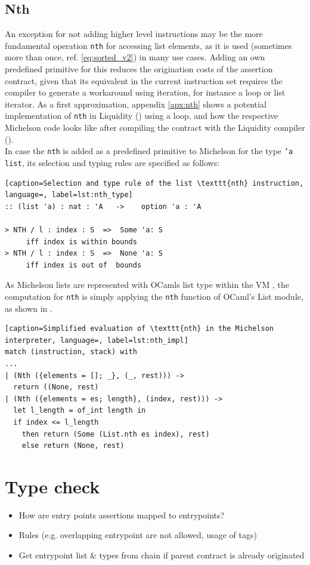 \subsection{Nth}
An exception for not adding higher level instructions may be the more fundamental operation \texttt{nth} for accessing list elements, as it is used (sometimes more than once, ref. \eqref{eq:sorted_v2}) in many use cases. Adding an own predefined primitive for this reduces the origination costs of the assertion contract, given that its equivalent in the current instruction set requires the compiler to generate a workaround using iteration, for instance a loop or list iterator. As a first approximation, appendix \ref{apx:nth} shows a potential implementation of \texttt{nth} in Liquidity () using a loop, and how the respective Michelson code looks like after compiling the contract with the Liquidity compiler (). \\
In case the \texttt{nth} is added as a predefined primitive to Michelson for the type \texttt{'a list}, its selection and typing rules are specified as follows:
\begin{lstlisting}[caption=Selection and type rule of the list \texttt{nth} instruction, language=, label=lst:nth_type]
:: (list 'a) : nat : 'A   ->  	option 'a : 'A

> NTH / l : index : S  =>  Some 'a: S
     iff index is within bounds
> NTH / l : index : S  =>  None 'a: S
     iff index is out of  bounds
\end{lstlisting}

As Michelson lists are represented with OCamls list type within the VM \cite{tezos_repo}, the computation for \texttt{nth} is simply applying the \texttt{nth} function of OCaml's List module, as shown in .
\begin{lstlisting}[caption=Simplified evaluation of \texttt{nth} in the Michelson interpreter, language=, label=lst:nth_impl]
match (instruction, stack) with
...
| (Nth ({elements = []; _}, (_, rest))) ->
  return ((None, rest)
| (Nth ({elements = es; length}, (index, rest))) ->
  let l_length = of_int length in
  if index <= l_length
    then return (Some (List.nth es index), rest)
    else return (None, rest)
\end{lstlisting}
\lstset{upquote=false}

\section{Type check}
\draft{}
\begin{itemize}
\item How are entry points assertions mapped to entrypoints?
\item Rules (e.g. overlapping entrypoint are not allowed, usage of tags)
\item Get entrypoint list \& types from chain if parent contract is already originated
\end{itemize}

